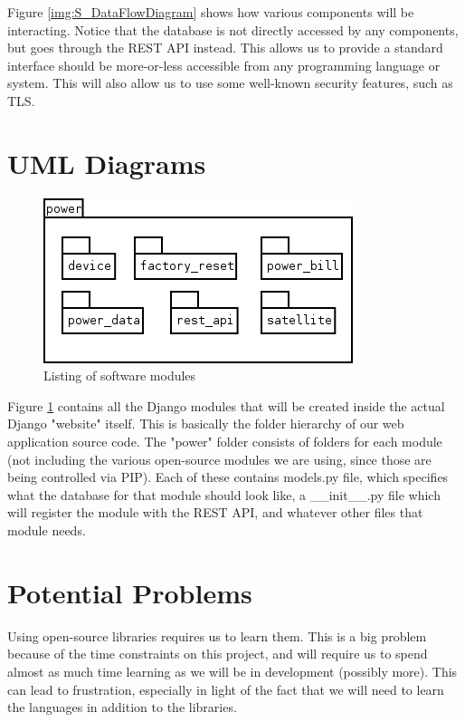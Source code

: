 Figure \ref{img:S_DataFlowDiagram} shows how various components will be interacting.
Notice that the database is not directly accessed by any components, but goes through the REST API instead.
This allows us to provide a standard interface should be more-or-less accessible from any programming language or system.
This will also allow us to use some well-known security features, such as TLS.

\section{UML Diagrams}

\begin{figure}[H]
\centering
\includegraphics[scale=0.75]{Software/images/Power-Package-Listing.png}
\caption{Listing of software modules}
\label{img:S_PackageListing}
\end{figure}

Figure \ref{img:S_PackageListing} contains all the Django modules that will be created inside the actual Django "website" itself.
This is basically the folder hierarchy of our web application source code.
The "power" folder consists of folders for each module (not including the various open-source modules we are using, since those are being controlled via PIP).
Each of these contains models.py file, which specifies what the database for that module should look like, a \_\_init\_\_.py file which will register the module with the REST API, and whatever other files that module needs.


\section{Potential Problems}

Using open-source libraries requires us to learn them.
This is a big problem because of the time constraints on this project, and will require us to spend almost as much time learning as we will be in development (possibly more).
This can lead to frustration, especially in light of the fact that we will need to learn the languages in addition to the libraries.

